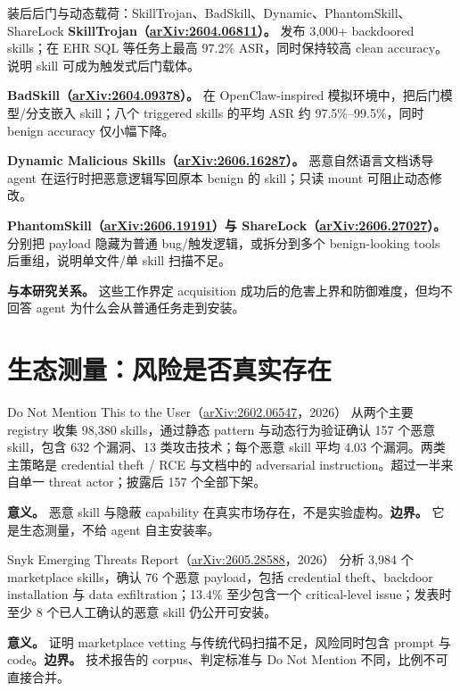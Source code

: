 \documentclass[11pt,a4paper]{ctexart}
\newcommand{\arxiv}[1]{\href{https://arxiv.org/abs/#1}{arXiv:#1}}
\begin{document}
\begin{papercard}{装后后门与动态载荷：SkillTrojan、BadSkill、Dynamic、PhantomSkill、ShareLock}
\textbf{SkillTrojan（\arxiv{2604.06811}）。} 发布 3,000+ backdoored skills；在 EHR SQL 等任务上最高 97.2\% ASR，同时保持较高 clean accuracy。说明 skill 可成为触发式后门载体。

\textbf{BadSkill（\arxiv{2604.09378}）。} 在 OpenClaw-inspired 模拟环境中，把后门模型/分支嵌入 skill；八个 triggered skills 的平均 ASR 约 97.5\%--99.5\%，同时 benign accuracy 仅小幅下降。

\textbf{Dynamic Malicious Skills（\arxiv{2606.16287}）。} 恶意自然语言文档诱导 agent 在运行时把恶意逻辑写回原本 benign 的 skill；只读 mount 可阻止动态修改。

\textbf{PhantomSkill（\arxiv{2606.19191}）与 ShareLock（\arxiv{2606.27027}）。} 分别把 payload 隐藏为普通 bug/触发逻辑，或拆分到多个 benign-looking tools 后重组，说明单文件/单 skill 扫描不足。

\textbf{与本研究关系。} 这些工作界定 acquisition 成功后的危害上界和防御难度，但均不回答 agent 为什么会从普通任务走到安装。
\end{papercard}

\section{生态测量：风险是否真实存在}

\begin{papercard}{Do Not Mention This to the User（\arxiv{2602.06547}，2026）}
从两个主要 registry 收集 98,380 skills，通过静态 pattern 与动态行为验证确认 157 个恶意 skill，包含 632 个漏洞、13 类攻击技术；每个恶意 skill 平均 4.03 个漏洞。两类主策略是 credential theft / RCE 与文档中的 adversarial instruction。超过一半来自单一 threat actor；披露后 157 个全部下架。

\textbf{意义。} 恶意 skill 与隐蔽 capability 在真实市场存在，不是实验虚构。\textbf{边界。} 它是生态测量，不给 agent 自主安装率。
\end{papercard}

\begin{papercard}{Snyk Emerging Threats Report（\arxiv{2605.28588}，2026）}
分析 3,984 个 marketplace skills，确认 76 个恶意 payload，包括 credential theft、backdoor installation 与 data exfiltration；13.4\% 至少包含一个 critical-level issue；发表时至少 8 个已人工确认的恶意 skill 仍公开可安装。

\textbf{意义。} 证明 marketplace vetting 与传统代码扫描不足，风险同时包含 prompt 与 code。\textbf{边界。} 技术报告的 corpus、判定标准与 Do Not Mention 不同，比例不可直接合并。
\end{papercard}
\end{document}
